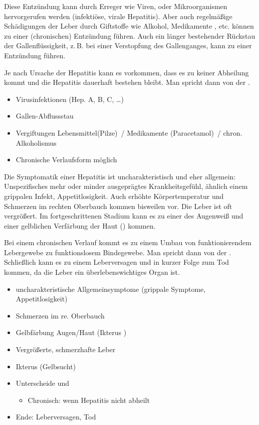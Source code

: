 {%
Diese Entzündung kann
durch Erreger wie Viren, oder Mikroorganismen hervorgerufen
werden (infektiöse, virale Hepatitis). Aber auch regelmäßige
Schädigungen der Leber durch Giftstoffe wie Alkohol,
Medikamente , etc. können zu einer
(chronischen) Entzündung führen. Auch ein länger bestehender
Rückstau der Gallenflüssigkeit, z.\,B. bei einer Verstopfung
des Gallenganges, kann zu einer Entzündung führen.

Je nach Ursache der Hepatitis kann es vorkommen, dass es zu
keiner Abheilung kommt und die Hepatitis dauerhaft bestehen
bleibt. Man spricht dann von der .} 
{
\begin{itemize}
  \item Virusinfektionen (Hep. A, B, C, \ldots )
  \item Gallen-Abflussstau
  \item Vergiftungen Lebensmittel(Pilze)~/
  Medikamente (Paracetamol)~/ chron. Alkoholismus
  \item Chronische Verlaufsform möglich
\end{itemize}
}{}{}{}

\TextSlide{\TxSymptome}
{%
Die Symptomatik einer Hepatitis ist uncharakteristisch und
eher allgemein: Unspezifisches mehr oder minder ausgeprägtes
Krankheitsgefühl, ähnlich einem grippalen Infekt,
Appetitlosigkeit. Auch erhöhte Körpertemperatur und
Schmerzen im rechten Oberbauch kommen bisweilen vor. Die
Leber ist oft
vergrößert.
Im
fortgeschrittenen Stadium kann es zu einer 
des Augenweiß und einer gelblichen Verfärbung der Haut
() kommen. 

Bei einem chronischen
Verlauf kommt es zu einem Umbau von
funktionierendem Lebergewebe zu
funktionslosem Bindegewebe. Man spricht
dann von der
\label{topic:leberzirrhose}.
Schließlich kann es zu einem Leberversagen und in kurzer
Folge zum Tod kommen, da die Leber ein überlebenswichtiges
Organ ist. 
}{
\begin{itemize}
  \item uncharakteristische Allgemeinsymptome (grippale Symptome,
  Appetitlosigkeit)
  \item Schmerzen im re. Oberbauch
  \item Gelbfärbung Augen/Haut (Ikterus )
  \item Vergrößerte, schmerzhafte Leber
  \item Ikterus (Gelbsucht)
  \item Unterscheide  und
  \begin{itemize}
    \item Chronisch: wenn Hepatitis nicht abheilt
  \end{itemize}
  \item Ende: Leberversagen, Tod
\end{itemize}
}{}{}{}



